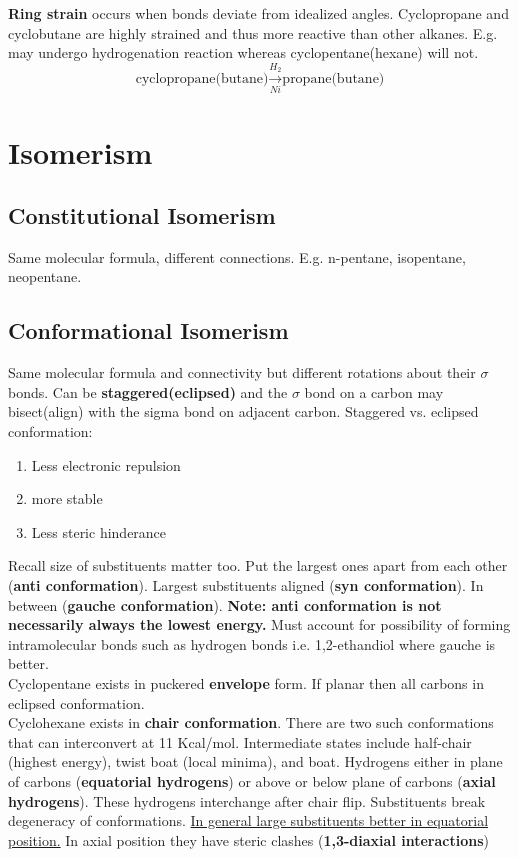 \documentclass[../OChemReview.tex]{subfiles}
\begin{document}
  \textbf{Ring strain} occurs when bonds deviate from idealized angles.
  Cyclopropane and cyclobutane are highly strained and thus more reactive than
  other alkanes. E.g. may undergo hydrogenation reaction whereas
  cyclopentane(hexane) will not.
  \[ \text{cyclopropane(butane)} \xrightarrow[Ni]{H_{2}} \text{propane(butane)}
\]

  \section{Isomerism}

  \subsection{Constitutional Isomerism}

  Same molecular formula, different connections. E.g. n-pentane, isopentane,
  neopentane.

  \subsection{Conformational Isomerism}

  Same molecular formula and connectivity but different rotations about their $
  \sigma $ bonds. Can be \textbf{staggered(eclipsed)} and the $ \sigma $ bond on
  a carbon may bisect(align) with the sigma bond on adjacent carbon. Staggered
  vs. eclipsed conformation:
  \begin{enumerate}
    \item Less electronic repulsion
    \item more stable
    \item Less steric hinderance
  \end{enumerate}

  Recall size of substituents matter too. Put the largest ones apart from each
  other (\textbf{anti conformation}). Largest substituents aligned (\textbf{syn
  conformation}). In between (\textbf{gauche conformation}). \textbf{Note: anti
  conformation is not necessarily always the lowest energy.} Must account for
  possibility of forming intramolecular bonds such as hydrogen bonds i.e.
  1,2-ethandiol where gauche is better.\\
  Cyclopentane exists in puckered \textbf{envelope} form. If planar then all
  carbons in eclipsed conformation. \\
  Cyclohexane exists in \textbf{chair conformation}. There are two such
  conformations that can interconvert at 11 Kcal/mol. Intermediate states
  include half-chair (highest energy), twist boat (local minima), and boat.
  Hydrogens either in plane of carbons (\textbf{equatorial hydrogens}) or above
  or below plane of carbons (\textbf{axial hydrogens}). These hydrogens
  interchange after chair flip. Substituents break degeneracy of conformations.
  \underline{In general large substituents better in equatorial position.} In
  axial position they have steric clashes (\textbf{1,3-diaxial interactions}) 
\end{document}
